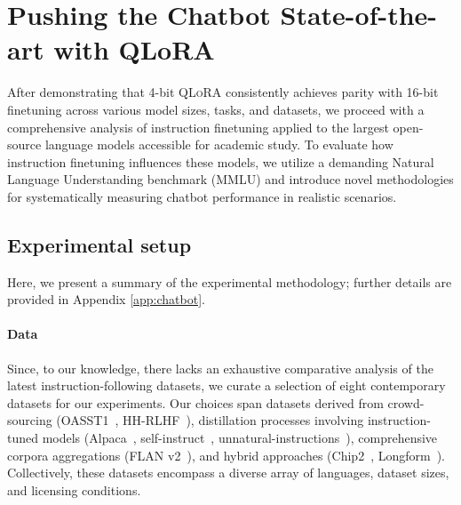 \section{Pushing the Chatbot State-of-the-art with QLoRA}
\label{sec:pushing}
After demonstrating that 4-bit \textsc{QLoRA} consistently achieves parity with 16-bit finetuning across various model sizes, tasks, and datasets, we proceed with a comprehensive analysis of instruction finetuning applied to the largest open-source language models accessible for academic study. To evaluate how instruction finetuning influences these models, we utilize a demanding Natural Language Understanding benchmark (MMLU) and introduce novel methodologies for systematically measuring chatbot performance in realistic scenarios.

\subsection{Experimental setup} Here, we present a summary of the experimental methodology; further details are provided in Appendix \ref{app:chatbot}.

\paragraph{Data} Since, to our knowledge, there lacks an exhaustive comparative analysis of the latest instruction-following datasets, we curate a selection of eight contemporary datasets for our experiments. Our choices span datasets derived from crowd-sourcing (OASST1~\citep{kopf2023openassistant}, HH-RLHF~\citep{bai2022training}), distillation processes involving instruction-tuned models (Alpaca~\citep{alpaca}, self-instruct~\citep{wang2022self}, unnatural-instructions~\citep{honovich2022unnatural}), comprehensive corpora aggregations (FLAN v2~\citep{chung2022scaling}), and hybrid approaches (Chip2~\citep{laion2023}, Longform~\citep{koksal2023longform}). Collectively, these datasets encompass a diverse array of languages, dataset sizes, and licensing conditions.

